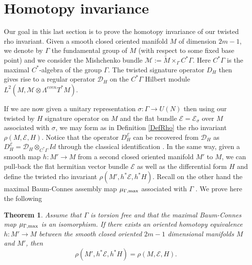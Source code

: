 \documentclass[12pt]{amsart}
\theoremstyle{plain}
\newtheorem{theorem}{Theorem}[section]
\theoremstyle{definition}
\theoremstyle{remark}
\begin{document}
{\section{Homotopy invariance}\label{sect:homotopy}

Our goal in this last section is to prove the homotopy invariance of our twisted rho invariant. Given a smooth closed oriented manifold $M$ of dimension $2m-1$, we denote  by $\Gamma$ the fundamental group of $M$ (with respect to some fixed base point) and we consider the  Mishchenko bundle ${\mathcal M}:= {\tilde M}\times_\Gamma C^*\Gamma$. Here $C^*\Gamma$ is the maximal $C^*$-algebra of the group $\Gamma$. The twisted signature operator $D_H$ then gives rise to a regular operator ${\mathcal D}_H$ on the $C^*\Gamma$ Hilbert module $L^2(M, {\mathcal M}\otimes \Lambda^{even}T^*M)$.  

 If we are now given   a unitary representation $\sigma:\Gamma\to U(N)$ then using our twisted by $H$ signature operator on $M$ and the flat bundle ${\mathcal E}={\mathcal E}_\sigma$ over $M$ associated with  $\sigma$, we may form as in Definition \ref{DefRho} the rho invariant $\rho (M, {\mathcal E}, H)$. Notice that the operator $D_H^{\mathcal E}$ can be recovered from ${\mathcal D}_H$ as $D_H^{\mathcal E}={\mathcal D}_H\otimes_{C^*\Gamma} Id$ through the classical  identification \cite{BP}.
 In the same way, given a smooth map $h: M'\to M$ from a second closed oriented manifold $M'$ to $M$, we can pull-back the flat hermitian vector bundle ${\mathcal E}$ as well as the differential form $H$ and define the twisted rho invariant $\rho (M', h^*{\mathcal E}, h^*H)$.  Recall on the other hand the maximal Baum-Connes assembly map $\mu_{\Gamma, \rm{max}}$ associated with $\Gamma$ \cite{BaumConnes}.  We prove here the following 
 
\begin{theorem}\label{HomotopyInvariance}
Assume that $\Gamma$ is torsion free and that the maximal Baum-Connes map $\mu_{\Gamma, \rm{max}}$ is an isomorphism. If there exists an oriented  homotopy  equivalence $h:M'\to M$ between the smooth closed oriented $2m-1$ dimensional manifolds $M$ and $M'$, then
$$
\rho (M', h^*{\mathcal E}, h^*H) = \rho (M, {\mathcal E}, H).
$$
\end{theorem}

}
\end{document}
